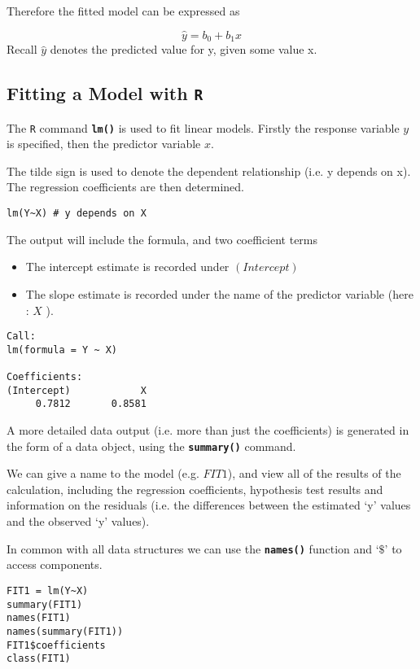 Therefore the fitted model can be expressed as

\[ \hat{y} = b_0 + b_1x \]
Recall $\hat{y}$  denotes the predicted value for y, given some value x.

\subsection{Fitting a Model with \texttt{R}}

The  \texttt{R} command   \texttt{\textbf{lm()}} is used to fit linear models. Firstly the response variable $y$  is specified, then the predictor variable $x$.

The tilde sign is used to denote the dependent relationship (i.e. y depends on x). The regression coefficients are then determined.

\begin{framed}
\begin{verbatim}
lm(Y~X) # y depends on X
\end{verbatim}
\end{framed}

The output will include the formula, and two coefficient terms
\begin{itemize}
\item The intercept estimate is recorded under $(Intercept)$
\item The slope estimate is recorded under the name of the predictor variable (here : $X$ ).
\end{itemize}	
	
\begin{verbatim}
Call:
lm(formula = Y ~ X)

Coefficients:
(Intercept)            X
     0.7812       0.8581
\end{verbatim}

A more detailed data output (i.e. more than just the coefficients) is generated in the form of a data object, using the \textbf{\texttt{summary()}} command.

We can give a name to the model (e.g. $FIT1$), and view all of the results of the calculation, including the regression coefficients, hypothesis test results and information on the residuals (i.e. the differences between the estimated ‘y’ values and the observed ‘y’ values).

In common with all data structures we can use the \textbf{\texttt{names()}} function and ‘$\$$’ to access components.

\begin{framed}
\begin{verbatim}
FIT1 = lm(Y~X)
summary(FIT1)
names(FIT1)
names(summary(FIT1))
FIT1$coefficients
class(FIT1)
\end{verbatim}
\end{framed}
\newpage
